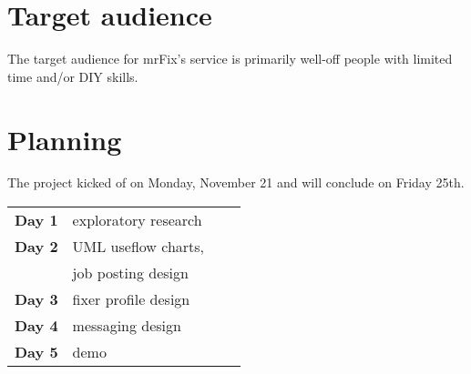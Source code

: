 \documentclass[11pt]{article}
\begin{document}
\section{Target audience}

The target audience for mrFix's service is primarily well-off people with limited time 
and/or DIY skills.

\newpage
\section{Planning}

The project kicked of on Monday, November 21 and will conclude on Friday 25th. 

\begin{table}[h]
	\begin{tabular}{llll} 
		\toprule
		\textbf{Day 1} & exploratory research \\
		\textbf{Day 2} & UML useflow charts, \\
					   & job posting design  \\
		\textbf{Day 3} & fixer profile design \\
		\textbf{Day 4} & messaging design \\
		\textbf{Day 5} & demo \\
	\end{tabular}
\end{table}
\end{document}

